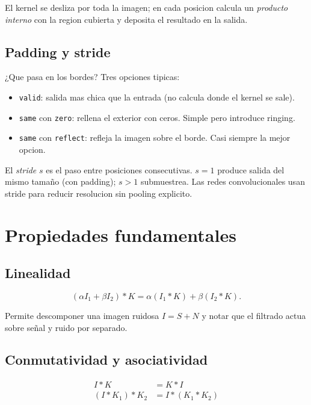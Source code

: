\documentclass[11pt,a4paper,twoside,openright]{book}
\begin{document}
El kernel se desliza por toda la imagen; en cada posicion calcula un \emph{producto interno} con la region cubierta y deposita el resultado en la salida.

\subsection{Padding y stride}

¿Que pasa en los bordes? Tres opciones tipicas:

\begin{itemize}[leftmargin=2em]
  \item \texttt{valid}: salida mas chica que la entrada (no calcula donde el kernel se sale).
  \item \texttt{same} con \texttt{zero}: rellena el exterior con ceros. Simple pero introduce ringing.
  \item \texttt{same} con \texttt{reflect}: refleja la imagen sobre el borde. Casi siempre la mejor opcion.
\end{itemize}

El \emph{stride} $s$ es el paso entre posiciones consecutivas. $s=1$ produce salida del mismo tamaño (con padding); $s>1$ submuestrea. Las redes convolucionales usan stride para reducir resolucion sin pooling explicito.

\section{Propiedades fundamentales}

\subsection{Linealidad}

\begin{equation}
(\alpha I_1 + \beta I_2) * K = \alpha (I_1 * K) + \beta (I_2 * K).
\end{equation}

Permite descomponer una imagen ruidosa $I = S + N$ y notar que el filtrado actua sobre señal y ruido por separado.

\subsection{Conmutatividad y asociatividad}

\begin{align}
I * K &= K * I \\
(I * K_1) * K_2 &= I * (K_1 * K_2)
\end{align}
\end{document}
